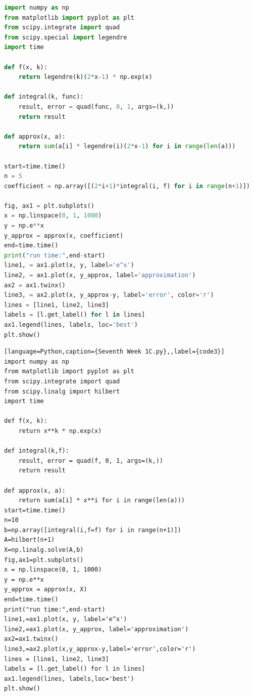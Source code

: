\documentclass[a4paper,11pt,notitlepage]{article}
\begin{document}
\begin{lstlisting}[language=Python,caption={Seventh Week 1B.py},label={code2}]
import numpy as np
from matplotlib import pyplot as plt
from scipy.integrate import quad
from scipy.special import legendre
import time

def f(x, k):
    return legendre(k)(2*x-1) * np.exp(x)

def integral(k, func):
    result, error = quad(func, 0, 1, args=(k,))
    return result

def approx(x, a):
    return sum(a[i] * legendre(i)(2*x-1) for i in range(len(a)))

start=time.time()
n = 5
coefficient = np.array([(2*i+1)*integral(i, f) for i in range(n+1)])

fig, ax1 = plt.subplots()
x = np.linspace(0, 1, 1000)
y = np.e**x
y_approx = approx(x, coefficient)
end=time.time()
print("run time:",end-start)
line1, = ax1.plot(x, y, label='e^x')
line2, = ax1.plot(x, y_approx, label='approximation')
ax2 = ax1.twinx()
line3, = ax2.plot(x, y_approx-y, label='error', color='r')
lines = [line1, line2, line3]
labels = [l.get_label() for l in lines]
ax1.legend(lines, labels, loc='best')
plt.show()       
\end{lstlisting}

\begin{lstlisting}[language=Python,caption={Seventh Week 1C.py},,label={code3}]
import numpy as np
from matplotlib import pyplot as plt
from scipy.integrate import quad
from scipy.linalg import hilbert
import time

def f(x, k):
    return x**k * np.exp(x)

def integral(k,f): 
    result, error = quad(f, 0, 1, args=(k,))
    return result

def approx(x, a):
    return sum(a[i] * x**i for i in range(len(a)))
start=time.time()
n=10
b=np.array([integral(i,f=f) for i in range(n+1)])
A=hilbert(n+1)
X=np.linalg.solve(A,b)
fig,ax1=plt.subplots()
x = np.linspace(0, 1, 1000)
y = np.e**x
y_approx = approx(x, X)
end=time.time()
print("run time:",end-start)
line1,=ax1.plot(x, y, label='e^x')
line2,=ax1.plot(x, y_approx, label='approximation')
ax2=ax1.twinx()
line3,=ax2.plot(x,y_approx-y,label='error',color='r')
lines = [line1, line2, line3]
labels = [l.get_label() for l in lines]
ax1.legend(lines, labels,loc='best')
plt.show()
\end{lstlisting}
\end{document}
